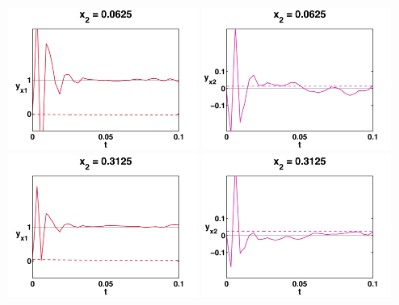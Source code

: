 \documentclass[a4paper,10pt,BCOR=15mm]{scrbook}
\begin{document}
\begin{figure}
\centering
 \begin{minipage}[b]{5cm}
    \includegraphics[width=5cm]{pics/fullOpti/new/x1_sigx2_1.pdf}  
  \end{minipage}
 \begin{minipage}[b]{5cm}
    \includegraphics[width=5cm]{pics/fullOpti/new/x1_sigx22_1.pdf}  
  \end{minipage}
\vspace{0.3cm}
 \begin{minipage}[b]{5cm}
    \includegraphics[width=5cm]{pics/fullOpti/new/x1_sigx2_2.pdf}  
  \end{minipage}
 \begin{minipage}[b]{5cm}
    \includegraphics[width=5cm]{pics/fullOpti/new/x1_sigx22_2.pdf}  
  \end{minipage}
\vspace{0.3cm}
 \begin{minipage}[b]{5cm}

\end{minipage}
\end{figure}
\end{document}
